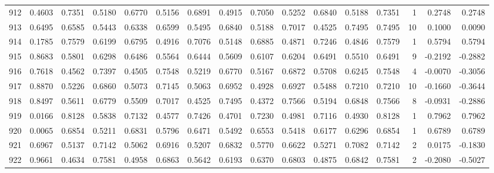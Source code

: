 \begin{tabular}{lrrrrrrrrrrrrrrr}
912 &      0.4603 &  0.7351 &  0.5180 &  0.6770 &  0.5156 &  0.6891 &  0.4915 &  0.7050 &  0.5252 &  0.6840 &   0.5188 &     0.7351 &      1 &                    0.2748 &                     0.2748 \\
913 &      0.6495 &  0.6585 &  0.5443 &  0.6338 &  0.6599 &  0.5495 &  0.6840 &  0.5188 &  0.7017 &  0.4525 &   0.7495 &     0.7495 &     10 &                    0.1000 &                     0.0090 \\
914 &      0.1785 &  0.7579 &  0.6199 &  0.6795 &  0.4916 &  0.7076 &  0.5148 &  0.6885 &  0.4871 &  0.7246 &   0.4846 &     0.7579 &      1 &                    0.5794 &                     0.5794 \\
915 &      0.8683 &  0.5801 &  0.6298 &  0.6486 &  0.5564 &  0.6444 &  0.5609 &  0.6107 &  0.6204 &  0.6491 &   0.5510 &     0.6491 &      9 &                   -0.2192 &                    -0.2882 \\
916 &      0.7618 &  0.4562 &  0.7397 &  0.4505 &  0.7548 &  0.5219 &  0.6770 &  0.5167 &  0.6872 &  0.5708 &   0.6245 &     0.7548 &      4 &                   -0.0070 &                    -0.3056 \\
917 &      0.8870 &  0.5226 &  0.6860 &  0.5073 &  0.7145 &  0.5063 &  0.6952 &  0.4928 &  0.6927 &  0.5488 &   0.7210 &     0.7210 &     10 &                   -0.1660 &                    -0.3644 \\
918 &      0.8497 &  0.5611 &  0.6779 &  0.5509 &  0.7017 &  0.4525 &  0.7495 &  0.4372 &  0.7566 &  0.5194 &   0.6848 &     0.7566 &      8 &                   -0.0931 &                    -0.2886 \\
919 &      0.0166 &  0.8128 &  0.5838 &  0.7132 &  0.4577 &  0.7426 &  0.4701 &  0.7230 &  0.4981 &  0.7116 &   0.4930 &     0.8128 &      1 &                    0.7962 &                     0.7962 \\
920 &      0.0065 &  0.6854 &  0.5211 &  0.6831 &  0.5796 &  0.6471 &  0.5492 &  0.6553 &  0.5418 &  0.6177 &   0.6296 &     0.6854 &      1 &                    0.6789 &                     0.6789 \\
921 &      0.6967 &  0.5137 &  0.7142 &  0.5062 &  0.6916 &  0.5207 &  0.6832 &  0.5770 &  0.6622 &  0.5271 &   0.7082 &     0.7142 &      2 &                    0.0175 &                    -0.1830 \\
922 &      0.9661 &  0.4634 &  0.7581 &  0.4958 &  0.6863 &  0.5642 &  0.6193 &  0.6370 &  0.6803 &  0.4875 &   0.6842 &     0.7581 &      2 &                   -0.2080 &                    -0.5027 \\

\end{tabular}
